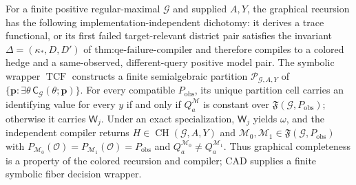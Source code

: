 For a finite positive regular-maximal \(\mathcal G\) and supplied \(A,Y\), the graphical recursion has the following implementation-independent dichotomy: it derives a trace functional, or its first failed target-relevant district pair satisfies the invariant \(\Delta=(\kappa_*,D,D')\) of \(\text{thm:qe-failure-compiler}\) and therefore compiles to a colored hedge and a same-observed, different-query positive model pair. The symbolic wrapper \(\operatorname{TCF}\) constructs a finite semialgebraic partition \(\mathscr P_{\mathcal G,A,Y}\) of \(\{\mathbf p:\exists\theta\,\mathsf C_{\mathcal G}(\theta;\mathbf p)\}\). For every compatible \(P_{\mathrm{obs}}\), its unique partition cell carries an identifying value for every \(y\) if and only if \(Q_a^{\mathcal M}\) is constant over \(\mathfrak F(\mathcal G,P_{\mathrm{obs}})\); otherwise it carries \(\mathsf W_j\). Under an exact specialization, \(\mathsf W_j\) yields \(\omega\), and the independent compiler returns \(H\in\operatorname{CH}(\mathcal G,A,Y)\) and \(\mathcal M_0,\mathcal M_1\in\mathfrak F(\mathcal G,P_{\mathrm{obs}})\) with \(P_{\mathcal M_0}(\mathcal O)=P_{\mathcal M_1}(\mathcal O)=P_{\mathrm{obs}}\) and \(Q_a^{\mathcal M_0}\neq Q_a^{\mathcal M_1}\). Thus graphical completeness is a property of the colored recursion and compiler; CAD supplies a finite symbolic fiber decision wrapper.